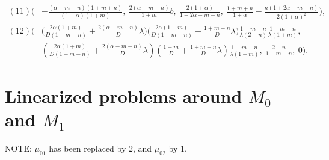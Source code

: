 \documentclass[a4paper,11pt]{article}
\def\blue{\color{blue}}
\theoremstyle{remark}
\begin{document}
{%
\begin{align*}
(11) \Big(&\underline{ -\frac{(\alpha-m-n)(1+m+n)}{(1+\alpha)(1+m)}}, \:\frac{2(\alpha-m-n)}{1+m}b, \:\frac{2(1+\alpha)}{1+2\alpha-m-n}, \:\frac{1+m+n}{1+\alpha} - \frac{n(1+2\alpha-m-n)}{2(1+\alpha)^2}\Big),\\
(12) \bigg(&\Big ( \frac{2\alpha(1+m)}{D(1-m-n)} + \frac{2(\alpha-m-n)}{D}\lambda\Big)\Big(\frac{2\alpha(1+m)}{D(1-m-n)} - \frac{1+m+n}{D}\lambda\Big)\frac{1-m-n}{\lambda(2-n)}\frac{1-m-n}{\lambda(1+m)}, \\
 &\left( \frac{2\alpha(1+m)}{D(1-m-n)} + \frac{2(\alpha-m-n)}{D}\lambda\right)\left(\frac{1+m}{D} + \frac{1+m+n}{D}\lambda\right)\frac{1-m-n}{\lambda(1+m)}, \ \frac{2-n}{1-m-n}, \ \underline{0}\bigg).
\end{align*}
}
\section{Linearized problems around $M_0$ and $M_1$}\label{append:lin}
{\blue NOTE: $\mu_{01}$ has been replaced by $2$, and $\mu_{02}$ by $1$.}
\end{document}
